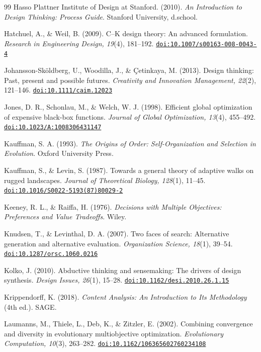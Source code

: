 \documentclass[10pt,twocolumn]{article}
\providecommand{\doi}[1]{\href{https://doi.org/#1}{\nolinkurl{doi:#1}}}
\theoremstyle{definition}
\begin{document}
\begin{thebibliography}{99}
 Hasso Plattner Institute of Design at Stanford. (2010). \textit{An Introduction to Design Thinking: Process Guide}. Stanford University, d.school.

 Hatchuel, A., \& Weil, B. (2009). C--K design theory: An advanced formulation. \textit{Research in Engineering Design, 19}(4), 181--192. \doi{10.1007/s00163-008-0043-4}

 Johansson-Sk{\"o}ldberg, U., Woodilla, J., \& \c{C}etinkaya, M. (2013). Design thinking: Past, present and possible futures. \textit{Creativity and Innovation Management, 22}(2), 121--146. \doi{10.1111/caim.12023}

 Jones, D. R., Schonlau, M., \& Welch, W. J. (1998). Efficient global optimization of expensive black-box functions. \textit{Journal of Global Optimization, 13}(4), 455--492. \doi{10.1023/A:1008306431147}

 Kauffman, S. A. (1993). \textit{The Origins of Order: Self-Organization and Selection in Evolution}. Oxford University Press.

 Kauffman, S., \& Levin, S. (1987). Towards a general theory of adaptive walks on rugged landscapes. \textit{Journal of Theoretical Biology, 128}(1), 11--45. \doi{10.1016/S0022-5193(87)80029-2}

 Keeney, R. L., \& Raiffa, H. (1976). \textit{Decisions with Multiple Objectives: Preferences and Value Tradeoffs}. Wiley.

 Knudsen, T., \& Levinthal, D. A. (2007). Two faces of search: Alternative generation and alternative evaluation. \textit{Organization Science, 18}(1), 39--54. \doi{10.1287/orsc.1060.0216}

 Kolko, J. (2010). Abductive thinking and sensemaking: The drivers of design synthesis. \textit{Design Issues, 26}(1), 15--28. \doi{10.1162/desi.2010.26.1.15}

 Krippendorff, K. (2018). \textit{Content Analysis: An Introduction to Its Methodology} (4th ed.). SAGE.

 Laumanns, M., Thiele, L., Deb, K., \& Zitzler, E. (2002). Combining convergence and diversity in evolutionary multiobjective optimization. \textit{Evolutionary Computation, 10}(3), 263--282. \doi{10.1162/106365602760234108}


\end{thebibliography}
\end{document}

